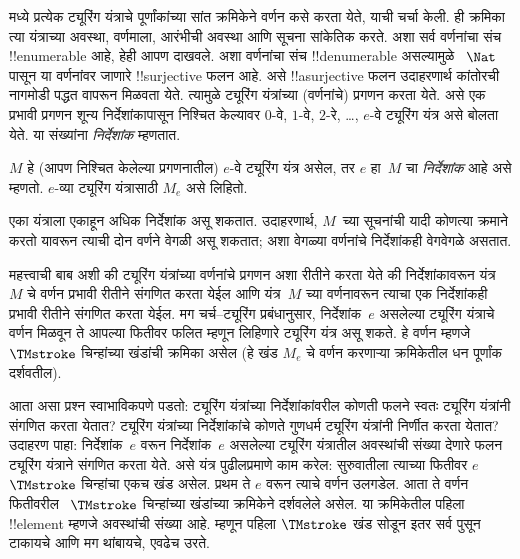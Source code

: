 \documentclass[../../../include/open-logic-section]{subfiles}
\begin{document}

 मध्ये प्रत्येक ट्यूरिंग यंत्राचे
पूर्णांकांच्या सांत क्रमिकेने वर्णन कसे करता येते,
याची चर्चा केली. ही क्रमिका त्या यंत्राच्या अवस्था,
वर्णमाला, आरंभीची अवस्था आणि सूचना सांकेतिक करते.
अशा सर्व वर्णनांचा संच !!{enumerable}
आहे, हेही आपण दाखवले. अशा वर्णनांचा संच
!!{denumerable} असल्यामुळे
~$\Nat$ पासून या वर्णनांवर जाणारे
!!{surjective} फलन आहे.
असे !!a{surjective} फलन उदाहरणार्थ कांतोरची
नागमोडी पद्धत वापरून मिळवता येते. त्यामुळे
ट्यूरिंग यंत्रांच्या (वर्णनांचे) प्रगणन करता येते.
असे एक प्रभावी प्रगणन शून्य निर्देशांकापासून निश्चित केल्यावर $0$-वे, $1$-वे,
$2$-रे, \dots, $e$-वे ट्यूरिंग यंत्र असे
बोलता येते. या संख्यांना \emph{निर्देशांक} म्हणतात.
%

\begin{defn}
$M$ हे (आपण निश्चित केलेल्या प्रगणनातील)
$e$-वे ट्यूरिंग यंत्र असेल, तर $e$ हा~$M$ चा
\emph{निर्देशांक} आहे असे म्हणतो. $e$-व्या
ट्यूरिंग यंत्रासाठी $M_e$ असे लिहितो.
\end{defn}

एका यंत्राला एकाहून अधिक निर्देशांक असू शकतात.
उदाहरणार्थ, $M$~च्या सूचनांची यादी कोणत्या
क्रमाने करतो यावरून त्याची दोन वर्णने वेगळी
असू शकतात; अशा वेगळ्या वर्णनांचे निर्देशांकही
वेगवेगळे असतात.

महत्त्वाची बाब अशी की ट्यूरिंग यंत्रांच्या वर्णनांचे
प्रगणन अशा रीतीने करता येते की निर्देशांकावरून
यंत्र~$M$ चे वर्णन प्रभावी रीतीने संगणित करता
येईल आणि यंत्र~$M$ च्या वर्णनावरून त्याचा
एक निर्देशांकही प्रभावी रीतीने संगणित करता
येईल. मग चर्च--ट्यूरिंग प्रबंधानुसार, निर्देशांक~$e$
असलेल्या ट्यूरिंग यंत्राचे वर्णन मिळवून ते
आपल्या फितीवर फलित म्हणून लिहिणारे ट्यूरिंग
यंत्र असू शकते. हे वर्णन म्हणजे
~$\TMstroke$ चिन्हांच्या खंडांची क्रमिका असेल
(हे खंड $M_e$ चे वर्णन करणाऱ्या क्रमिकेतील
धन पूर्णांक दर्शवतील).

आता असा प्रश्न स्वाभाविकपणे पडतो: ट्यूरिंग
यंत्रांच्या निर्देशांकांवरील कोणती फलने स्वतः
ट्यूरिंग यंत्रांनी संगणित करता येतात? ट्यूरिंग
यंत्रांच्या निर्देशांकांचे कोणते गुणधर्म ट्यूरिंग
यंत्रांनी निर्णीत करता येतात? उदाहरण पाहा:
निर्देशांक~$e$ वरून निर्देशांक~$e$ असलेल्या
ट्यूरिंग यंत्रातील अवस्थांची संख्या देणारे
फलन ट्यूरिंग यंत्राने संगणित करता येते.
असे यंत्र पुढीलप्रमाणे काम करेल: सुरुवातीला
त्याच्या फितीवर $e$~$\TMstroke$ चिन्हांचा
एकच खंड असेल. प्रथम ते $e$ वरून त्याचे
वर्णन उलगडेल. आता ते वर्णन फितीवरील
~$\TMstroke$ चिन्हांच्या खंडांच्या क्रमिकेने
दर्शवलेले असेल. या क्रमिकेतील पहिला
!!{element} म्हणजे अवस्थांची संख्या आहे.
म्हणून पहिला $\TMstroke$ खंड सोडून इतर
सर्व पुसून टाकायचे आणि मग थांबायचे, एवढेच
उरते.
\end{document}
